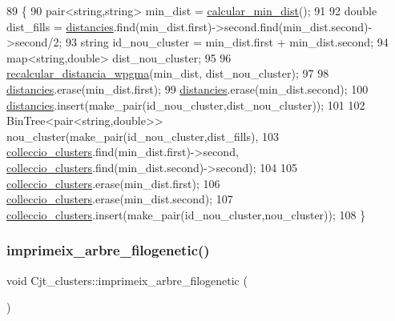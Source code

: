 \begin{DoxyCode}
89                             \{
90     pair<string,string> min\_dist = \hyperlink{class_cjt__clusters_afe0ecfc740e82c1c00f549ef12279673}{calcular\_min\_dist}();
91 
92     \textcolor{keywordtype}{double} dist\_fills = \hyperlink{class_cjt__clusters_a8e94e53830e3224d791dcf7dbd0a6082}{distancies}.find(min\_dist.first)->second.find(min\_dist.second)->second/2;
93     \textcolor{keywordtype}{string} id\_nou\_cluster = min\_dist.first + min\_dist.second;
94     map<string,double> dist\_nou\_cluster;
95 
96     \hyperlink{class_cjt__clusters_a208f3642fdfe3c3ba9eacc659918f6fa}{recalcular\_distancia\_wpgma}(min\_dist, dist\_nou\_cluster);
97 
98     \hyperlink{class_cjt__clusters_a8e94e53830e3224d791dcf7dbd0a6082}{distancies}.erase(min\_dist.first);
99     \hyperlink{class_cjt__clusters_a8e94e53830e3224d791dcf7dbd0a6082}{distancies}.erase(min\_dist.second);
100     \hyperlink{class_cjt__clusters_a8e94e53830e3224d791dcf7dbd0a6082}{distancies}.insert(make\_pair(id\_nou\_cluster,dist\_nou\_cluster));
101 
102     BinTree<pair<string,double>> nou\_cluster(make\_pair(id\_nou\_cluster,dist\_fills),
103         \hyperlink{class_cjt__clusters_aea7d6362517dd16cbd12736a3da50021}{colleccio\_clusters}.find(min\_dist.first)->second, 
      \hyperlink{class_cjt__clusters_aea7d6362517dd16cbd12736a3da50021}{colleccio\_clusters}.find(min\_dist.second)->second);
104 
105     \hyperlink{class_cjt__clusters_aea7d6362517dd16cbd12736a3da50021}{colleccio\_clusters}.erase(min\_dist.first);
106     \hyperlink{class_cjt__clusters_aea7d6362517dd16cbd12736a3da50021}{colleccio\_clusters}.erase(min\_dist.second);
107     \hyperlink{class_cjt__clusters_aea7d6362517dd16cbd12736a3da50021}{colleccio\_clusters}.insert(make\_pair(id\_nou\_cluster,nou\_cluster));
108 \}
\end{DoxyCode}
\mbox{\label{class_cjt__clusters_a952291f47c4dd2edf62b3c110bee24f2}} 
\subsubsection{\texorpdfstring{imprimeix\+\_\+arbre\+\_\+filogenetic()}{imprimeix\_arbre\_filogenetic()}}
{\footnotesize\ttfamily void Cjt\+\_\+clusters\+::imprimeix\+\_\+arbre\+\_\+filogenetic (\begin{DoxyParamCaption}{ }\end{DoxyParamCaption})}



